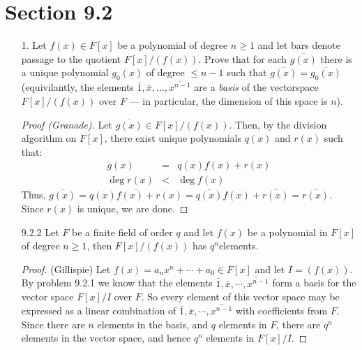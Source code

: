 \documentclass[10pt]{article}
\begin{document}
\section*{Section 9.2}

\begin{itemize}

\item [1.] Let $f\left(x\right)\in F\left[x\right]$ be a polynomial of
degree $n\ge1$ and let bars denote passage to the quotient
$F\left[x\right]/\left(f\left(x\right)\right)$. Prove that for each
$\overline{g\left(x\right)}$ there is a unique polynomial
$g_{0}\left(x\right)$ of degree $\le n-1$ such that
$\overline{g\left(x\right)}=\overline{g_{0}\left(x\right)}$
(equivilantly, the elements
$\overline{1},\overline{x},\dots,\overline{x^{n-1}}$ are a
\emph{basis} of the vectorspace
$F\left[x\right]/\left(f\left(x\right)\right)$ over $F$ --- in
particular, the dimension of this space is $n$).

\begin{proof} [Proof (Granade)]
Let $\overline{g\left(x\right)}\in
F\left[x\right]/\left(f\left(x\right)\right)$. Then, by the division
algorithm on $F\left[x\right]$, there exist unique polynomials
$q\left(x\right)$ and $r\left(x\right)$ such that:\begin{eqnarray*}
g\left(x\right) & = & q\left(x\right)f\left(x\right)+r\left(x\right)\\
\deg r\left(x\right) & < & \deg f\left(x\right)\end{eqnarray*} Thus,
$\overline{g\left(x\right)}=\overline{q\left(x\right)f\left(x\right)+r\left(x\right)}=\overline{q\left(x\right)}f\left(x\right)+\overline{r\left(x\right)}=\overline{r\left(x\right)}$.
Since $r\left(x\right)$ is unique, we are done.
\end{proof}


\item[9.2.2]   Let $F$ be a finite field of order
$q$ and let $f(x)$ be a polynomial in $F[x]$ of degree $n\ge1$, then
$F[x]/(f(x))$ has $q^{n}$elements.

\begin{proof}
(Gillispie) Let $f(x)=a_{n}x^{n}+\cdots+a_{0}\in F[x]$ and let
$I=(f(x))$. By problem 9.2.1 we know that the elements
$\bar{1},\bar{x},\cdots\bar{,x^{n-1}}$ form a basis for the vector
space $F[x]/I$ over $F$. So every element of this vector space may
be expressed as a linear combination of
$\bar{1},\bar{x},\cdots,\bar{x^{n-1}}$ with coefficients from $F$.
Since there are $n$ elements in the basis, and $q$ elements in $F$,
there are $q^{n}$ elements in the vector space, and hence $q^{n}$
elements in $F[x]/I$.


\end{proof}
\end{itemize}
\end{document}

